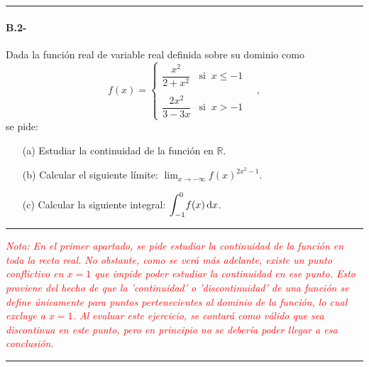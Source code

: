 \noindent\rule{\textwidth}{0.5pt}
\begin{mybox}
    \paragraph{B.2-}Dada la función real de variable real definida sobre su dominio como  
    $$
    f(x)=\begin{cases}
        \dfrac{x^2}{2+x^2} & \text{si }\   x\le -1\\\\
        \dfrac{2x^2}{3-3x} & \text{si }\   x>-1
    \end{cases}\quad ,$$
    se pide:
    \begin{enumerate}
        \item[(a)] Estudiar la continuidad de la función en $\mathbb{R}$.
        \item[(b)] Calcular el siguiente límite: $\displaystyle{\lim_{x\to -\infty }} f(x)^{2x^2-1}$.
        \item[(c)] Calcular la siguiente integral: $\displaystyle{\int_{-1}^0} f(x) \odif{x}$.
    \end{enumerate}
\end{mybox}
\noindent\rule{\textwidth}{0.5pt}
\textit{\textcolor{red}{Nota: En el primer apartado, se pide estudiar la continuidad de la función en toda la recta real. No obstante, como se verá más adelante, existe un punto conflictivo en $x=1$ que impide poder estudiar la continuidad en ese punto. Esto proviene del hecho de que la 'continuidad' o 'discontinuidad' de una función se define únicamente para puntos pertenecientes al dominio de la función, lo cual excluye a $x=1$. Al evaluar este ejercicio, se contará como válido que sea discontinua en este punto, pero en principio no se debería poder llegar a esa conclusión.}}\\
\noindent\rule{\textwidth}{0.5pt}
